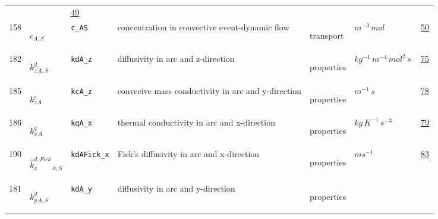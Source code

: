 \begin{longtable}{|p{1cm}|p{2.5cm}|p{4.5cm}|p{8cm}|p{3.0cm}|p{3cm}|p{1cm}|}
             & $  $
             &                 \hyperlink{"e:49"}{ 49 }
                 \\
            158
             & \hypertarget{"v:158"}{ $ {c}{_{A, S}} $}
             & \verb|c_AS|
             & concentration in convective event-dynamic flow
             & \begin{lay}transport \end{lay}
             & $ m^{-3} \,mol \, $
             &                 \hyperlink{"e:50"}{ 50 }
                 \\
            182
             & \hypertarget{"v:182"}{ $ {{k^d_z}}{_{A, S}} $}
             & \verb|kdA_z|
             & diffusivity in arc and z-direction
             & \begin{lay}properties \end{lay}
             & $ kg^{-1} \,m^{-4} \,mol^{2} \,s \, $
             &                 \hyperlink{"e:75"}{ 75 }
                 \\
            185
             & \hypertarget{"v:185"}{ $ {{k^c_z}}{_{A}} $}
             & \verb|kcA_z|
             & convecive mass conductivity in arc and y-direction
             & \begin{lay}properties \end{lay}
             & $ m^{-1} \,s \, $
             &                 \hyperlink{"e:78"}{ 78 }
                 \\
            186
             & \hypertarget{"v:186"}{ $ {{k^q_x}}{_{A}} $}
             & \verb|kqA_x|
             & thermal conductivity in arc and x-direction
             & \begin{lay}properties \end{lay}
             & $ kg \,K^{-1} \,s^{-3} \, $
             &                 \hyperlink{"e:79"}{ 79 }
                 \\
            190
             & \hypertarget{"v:190"}{ $ {{\hat{k}^{d,Fick}_x}}{_{A, S}} $}
             & \verb|kdAFick_x|
             & Fick's diffusivity in arc and x-direction
             & \begin{lay}properties \end{lay}
             & $ m s^{-1} \, $
             &                 \hyperlink{"e:83"}{ 83 }
                 \\
            181
             & \hypertarget{"v:181"}{ $ {{k^d_y}}{_{A, S}} $}
             & \verb|kdA_y|
             & diffusivity in arc and y-direction
             & \begin{lay}properties \end{lay}

\end{longtable}
